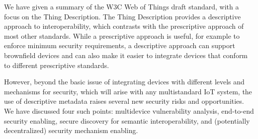 We have given a summary of the W3C Web of Things draft
standard, with a focus on the Thing Description.
The Thing Description provides a descriptive approach to 
interoperability, which contrasts with the prescriptive
approach of most other standards.
While a prescriptive approach is useful, for example to
enforce minimum security requirements,
a descriptive approach can support brownfield devices
and can also make it easier to integrate devices that
conform to different prescriptive standards.

However, beyond the basic issue of integrating devices
with different levels and mechanisms for security,
which will arise with any multistandard IoT system,
the use of descriptive metadata raises several
new security risks and opportunities.  
We have discussed four such points: 
multidevice vulnerability analysis,
end-to-end security enabling,
secure discovery for semantic interoperability,
and (potentially decentralized) security mechanism enabling.
